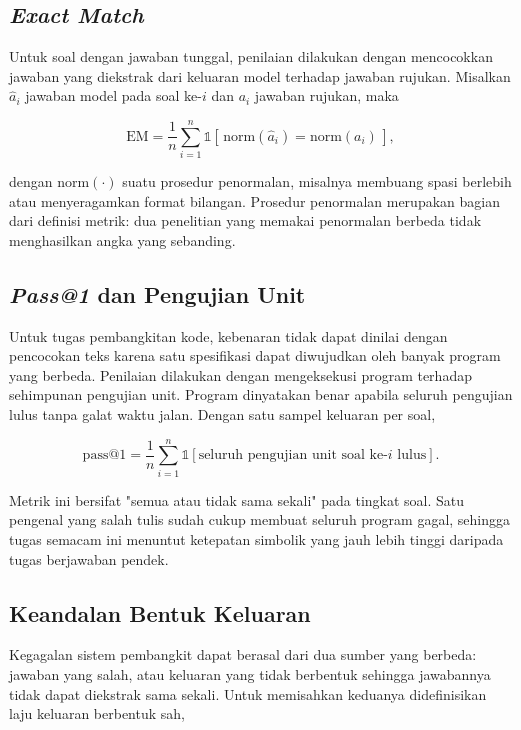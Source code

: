 \subsection{\textit{Exact Match}}

Untuk soal dengan jawaban tunggal, penilaian dilakukan dengan mencocokkan
jawaban yang diekstrak dari keluaran model terhadap jawaban rujukan. Misalkan
$\hat a_i$ jawaban model pada soal ke-$i$ dan $a_i$ jawaban rujukan, maka

\begin{equation}
    \mathrm{EM} = \frac{1}{n}\sum_{i=1}^{n}
    \mathbb{1}\!\left[\,\mathrm{norm}(\hat a_i) = \mathrm{norm}(a_i)\,\right],
\end{equation}

dengan $\mathrm{norm}(\cdot)$ suatu prosedur penormalan, misalnya membuang
spasi berlebih atau menyeragamkan format bilangan. Prosedur penormalan
merupakan bagian dari definisi metrik: dua penelitian yang memakai penormalan
berbeda tidak menghasilkan angka yang sebanding.

\subsection{\textit{Pass@1} dan Pengujian Unit}

Untuk tugas pembangkitan kode, kebenaran tidak dapat dinilai dengan pencocokan
teks karena satu spesifikasi dapat diwujudkan oleh banyak program yang berbeda.
Penilaian dilakukan dengan mengeksekusi program terhadap sehimpunan pengujian
unit. Program dinyatakan benar apabila seluruh pengujian lulus tanpa galat
waktu jalan. Dengan satu sampel keluaran per soal,

\begin{equation}
    \mathrm{pass@1} = \frac{1}{n}\sum_{i=1}^{n}
    \mathbb{1}\!\left[\text{seluruh pengujian unit soal ke-}i\text{ lulus}\right].
\end{equation}

Metrik ini bersifat "semua atau tidak sama sekali" pada tingkat soal. Satu
pengenal yang salah tulis sudah cukup membuat seluruh program gagal, sehingga
tugas semacam ini menuntut ketepatan simbolik yang jauh lebih tinggi daripada
tugas berjawaban pendek.

\subsection{Keandalan Bentuk Keluaran}

Kegagalan sistem pembangkit dapat berasal dari dua sumber yang berbeda:
jawaban yang salah, atau keluaran yang tidak berbentuk sehingga jawabannya
tidak dapat diekstrak sama sekali. Untuk memisahkan keduanya didefinisikan
laju keluaran berbentuk sah,

